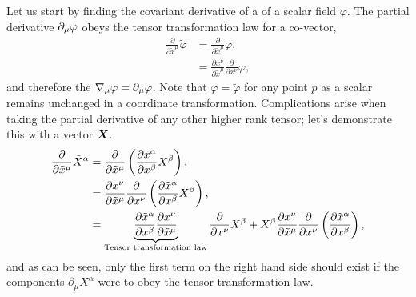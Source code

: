 Let us start by finding the covariant derivative of a of a scalar field $\varphi$. The partial derivative $\partial_\mu \varphi$ obeys the tensor transformation law for a co-vector,
\begin{align}
\frac{\partial}{\partial \tilde{x}^\mu} \tilde{\varphi} &=\frac{\partial}{\partial \tilde{x}^\mu} {\varphi} ,\\
                                                        &=\frac{\partial x^\nu}{\partial\tilde{x}^\mu}\frac{\partial}{\partial {x}^\nu} {\varphi},
\end{align}
and therefore the $\nabla_\mu \varphi = \partial_\mu \varphi$. Note that $\varphi=\tilde{\varphi}$ for any point $p$ as a scalar remains unchanged in a coordinate transformation. Complications arise when taking the partial derivative of any other higher rank tensor; let's demonstrate this with a vector $\boldsymbol{X}$.
\begin{align}
\frac{\partial}{\partial \tilde{x}^\mu} \tilde{X}^\alpha &= \frac{\partial}{\partial \tilde{x}^\mu}\left( \frac{\partial \tilde{x}^\alpha}{\partial x^\beta}{X}^\beta\right),\\
                                                         &= \frac{\partial x^\nu}{\partial \tilde{x}^\mu}\frac{\partial}{\partial {x}^\nu}\left( \frac{\partial \tilde{x}^\alpha}{\partial x^\beta}{X}^\beta\right),\\
                                                         &= \underbrace{\frac{\partial \tilde{x}^\alpha}{\partial x^\beta}\frac{\partial x^\nu}{\partial \tilde{x}^\mu}}_{\mathrm{Tensor}\,\,\rm{transformation}\,\,\rm{law}}\frac{\partial}{\partial {x}^\nu} {X}^\beta + {X}^\beta\frac{\partial x^\nu}{\partial \tilde{x}^\mu}\frac{\partial}{\partial {x}^\nu}\left( \frac{\partial \tilde{x}^\alpha}{\partial x^\beta}\right),
\end{align}
and as can be seen, only the first term on the right hand side should exist if the components $\partial_\mu X^\alpha$ were to obey the tensor transformation law. 

